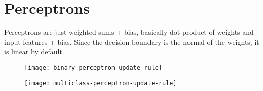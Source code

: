 \section{Perceptrons}
Perceptrons are just weighted sums + bias, basically dot product of weights and input features + bias. Since the decision boundary is the normal of the weights, it is linear by default.
\begin{figure}[H]
\centering
\texttt{[image: binary-perceptron-update-rule]}
\end{figure}
\begin{figure}[H]
\centering
\texttt{[image: multiclass-perceptron-update-rule]}
\end{figure}
